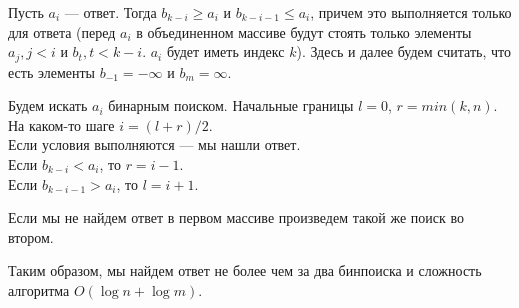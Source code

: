 \documentclass[10pt]{article}
\begin{document}
\begin{enumerate}[1.]
	Пусть $a_i$ --- ответ. Тогда $b_{k-i} \ge a_i$ и $b_{k-i-1} \le a_i$, причем это выполняется только для ответа (перед $a_i$ в объединенном массиве будут стоять только элементы $a_j, j<i$ и $b_t, t<k-i$. $a_i$ будет иметь индекс $k$). Здесь и далее будем считать, что есть элементы $b_{-1} = -\infty$ и $b_m=\infty$.
	
	Будем искать $a_i$ бинарным поиском. Начальные границы $l=0$, $r=min(k, n)$. На каком-то шаге $i=(l+r)/2$.\\
	Если условия выполняются --- мы нашли ответ.\\
	Если $b_{k-i} < a_i$, то $r=i-1$.\\
	Если $b_{k-i-1} > a_i$, то $l=i+1$.
	
	Если мы не найдем ответ в первом массиве произведем такой же поиск во втором.
	
	Таким образом, мы найдем ответ не более чем за два бинпоиска и сложность алгоритма $O(\log n + \log m)$.
\end{enumerate}
\end{document}
